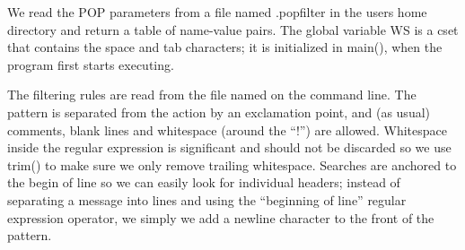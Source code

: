 
We read the POP parameters from a file named \textsf{.popfilter} in the
user{\textquotesingle}s home directory and return a table of name-value
pairs. The global variable \textsf{WS} is a cset that contains the
space and tab characters; it is initialized in \textsf{main()}, when
the program first starts executing.


The filtering rules are read from the file named on the command line.
The pattern is separated from the action by an exclamation point, and
(as usual) comments, blank lines and whitespace (around the
{\textquotedblleft}!{\textquotedblright}) are allowed. Whitespace
inside the regular expression is significant and should not be
discarded so we use \textsf{trim()} to make sure we only remove
trailing whitespace. Searches are anchored to the begin of line so we
can easily look for individual headers; instead of separating a message
into lines and using the {\textquotedblleft}beginning of
line{\textquotedblright} regular expression operator, we simply we add
a newline character to the front of the pattern.

